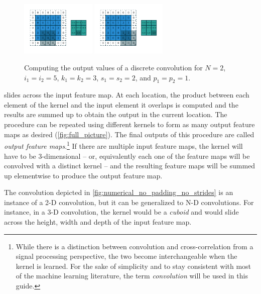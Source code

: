 \documentclass[notitlepage]{report}
\begin{document}
\begin{figure}[p]
    \includegraphics[width=0.32\textwidth]{pdf/numerical_padding_strides_07.pdf}
    \includegraphics[width=0.32\textwidth]{pdf/numerical_padding_strides_08.pdf}
    \caption{\label{fig:numerical_padding_strides} Computing the output values
        of a discrete convolution for $N = 2$, $i_1 = i_2 = 5$, $k_1 = k_2 = 3$,
        $s_1 = s_2 = 2$, and $p_1 = p_2 = 1$.}
\end{figure}

\noindent slides across the input feature map. At each location, the product
between each element of the kernel and the input element it overlaps is computed
and the results are summed up to obtain the output in the current location. The
procedure can be repeated using different kernels to form as many output feature
maps as desired (\autoref{fig:full_picture}). The final outputs of this procedure
are called {\em output feature maps}.\footnote{%
    While there is a distinction between convolution and cross-correlation from
    a signal processing perspective, the two become interchangeable when the
    kernel is learned. For the sake of simplicity and to stay consistent with
    most of the machine learning literature, the term {\em convolution\/}
    will be used in this guide.}
If there are multiple input feature maps, the kernel will have to be
3-dimensional -- or, equivalently each one of the feature maps will be
convolved with a distinct kernel -- and the resulting feature maps will
be summed up elementwise to produce the output feature map.

The convolution depicted in \autoref{fig:numerical_no_padding_no_strides} is an
instance of a 2-D convolution, but it can be generalized to N-D convolutions.
For instance, in a 3-D convolution, the kernel would be a {\em cuboid\/} and
would slide across the height, width and depth of the input feature map.
\end{document}
